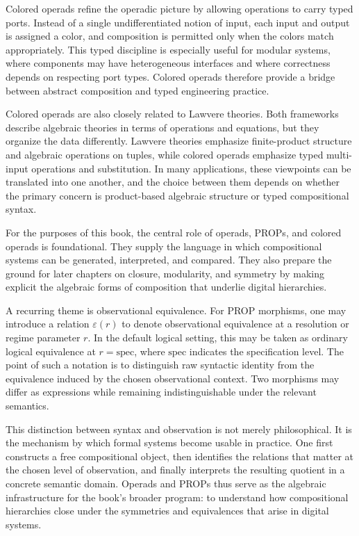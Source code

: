 \documentclass[11pt]{article}
\begin{document}
Colored operads refine the operadic picture by allowing operations to carry typed ports. Instead of a single undifferentiated notion of input, each input and output is assigned a color, and composition is permitted only when the colors match appropriately. This typed discipline is especially useful for modular systems, where components may have heterogeneous interfaces and where correctness depends on respecting port types. Colored operads therefore provide a bridge between abstract composition and typed engineering practice.

Colored operads are also closely related to Lawvere theories. Both frameworks describe algebraic theories in terms of operations and equations, but they organize the data differently. Lawvere theories emphasize finite-product structure and algebraic operations on tuples, while colored operads emphasize typed multi-input operations and substitution. In many applications, these viewpoints can be translated into one another, and the choice between them depends on whether the primary concern is product-based algebraic structure or typed compositional syntax.

For the purposes of this book, the central role of operads, PROPs, and colored operads is foundational. They supply the language in which compositional systems can be generated, interpreted, and compared. They also prepare the ground for later chapters on closure, modularity, and symmetry by making explicit the algebraic forms of composition that underlie digital hierarchies.

A recurring theme is observational equivalence. For PROP morphisms, one may introduce a relation \(\varepsilon(r)\) to denote observational equivalence at a resolution or regime parameter \(r\). In the default logical setting, this may be taken as ordinary logical equivalence at \(r = \mathrm{spec}\), where \(\mathrm{spec}\) indicates the specification level. The point of such a notation is to distinguish raw syntactic identity from the equivalence induced by the chosen observational context. Two morphisms may differ as expressions while remaining indistinguishable under the relevant semantics.

This distinction between syntax and observation is not merely philosophical. It is the mechanism by which formal systems become usable in practice. One first constructs a free compositional object, then identifies the relations that matter at the chosen level of observation, and finally interprets the resulting quotient in a concrete semantic domain. Operads and PROPs thus serve as the algebraic infrastructure for the book’s broader program: to understand how compositional hierarchies close under the symmetries and equivalences that arise in digital systems.
\end{document}
